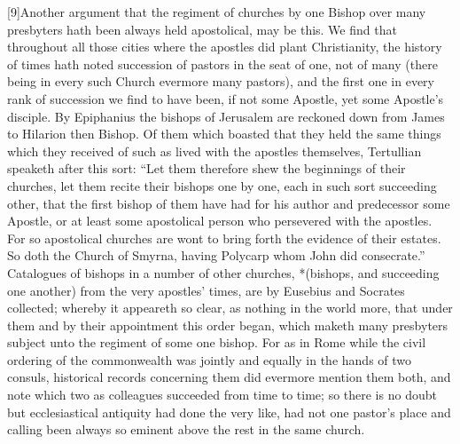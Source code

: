 [9]Another argument that the regiment of churches by one Bishop over many presbyters hath been always held apostolical, may be this. We find that throughout all those cities where the apostles did plant Christianity, the history of times hath noted succession of pastors in the seat of one, not of many (there being in every such Church evermore many pastors), and the first one in every rank of succession we find to have been, if not some Apostle, yet some Apostle’s disciple. By Epiphanius the bishops of Jerusalem are reckoned down from James to Hilarion then Bishop. Of them which boasted that they held the same things which they received of such as lived with the apostles themselves, Tertullian speaketh after this sort: “Let them therefore  shew the beginnings of their churches,
 let them recite their bishops one by one, each in such sort succeeding other, that the first bishop of them have had for his author and predecessor some Apostle, or at least some apostolical person who persevered with the apostles. For so apostolical churches are wont to bring forth the evidence of their estates. So doth the Church of Smyrna, having Polycarp whom John did consecrate.” Catalogues of bishops in a number of other churches, *(bishops, and succeeding one another) from the very apostles’ times, are by Eusebius and Socrates collected; whereby it appeareth so clear, as nothing in the world more, that under them and by their appointment this order began, which maketh many presbyters subject unto the regiment of some one bishop. For as in Rome while the civil ordering of the commonwealth was jointly and equally in the hands of two consuls, historical records concerning them did evermore mention them both, and note which two as colleagues succeeded from time to time; so there is no doubt but ecclesiastical antiquity had done the very like, had not one pastor’s place and calling been always so eminent above the rest in the same church.

